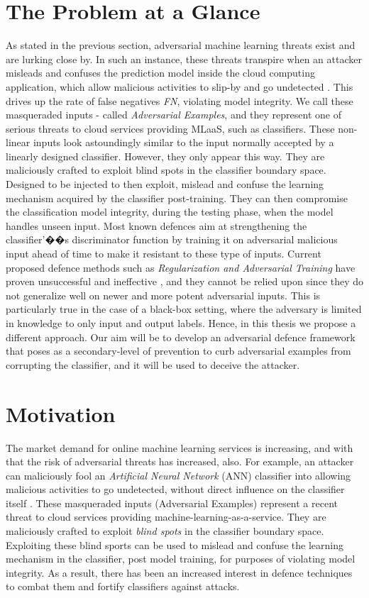 \documentclass[grad,lot,lof,11pt,oneside,onehalfspace]{RUthesis}
\begin{document}
\section{The Problem at a Glance}
  As  stated in the previous section, adversarial machine learning threats exist and are lurking close by. In such an instance, these threats transpire when an attacker misleads and confuses the prediction model inside the cloud computing application, which allow malicious activities to slip-by and go undetected \cite{nguyen_deep_2015}. This  drives up the rate of false negatives \textit{FN}, violating model integrity. We call these masqueraded inputs - called \textit{Adversarial Examples}\cite{kurakin_adversarial_2017}, and they represent one of serious threats to cloud services providing MLaaS, such as classifiers. These non-linear inputs look astoundingly similar to the input normally accepted by a linearly designed classifier. However, they only appear this way. They are maliciously crafted to exploit blind spots in the classifier boundary space. Designed to be injected to then exploit, mislead and confuse the learning mechanism acquired by the classifier post-training. They can then compromise the classification model integrity, during the testing phase, when the model handles unseen input. Most known defences aim at strengthening the classifier'��s discriminator function by training it on adversarial malicious input ahead of time to make it resistant to these type of inputs. Current proposed defence methods such as \textit{Regularization and Adversarial Training} have proven unsuccessful and ineffective \cite{yuan_adversarial_2017}, and they cannot be relied upon since they do not generalize well on newer and more potent adversarial inputs.  This is particularly true in the case of a black-box setting, where the adversary is limited in knowledge to only input and output labels. Hence, in this thesis we propose a different approach. Our aim will be to develop an adversarial defence framework that poses as a secondary-level of prevention to curb adversarial examples from corrupting the classifier, and it will be used to deceive  the attacker.
  
  
\section{Motivation}
  The market demand for online machine learning services is increasing, and with that the risk of adversarial threats has increased, also. For example, an attacker can maliciously fool an \textit{Artificial Neural Network} (ANN) classifier into allowing malicious activities to go undetected, without direct influence on the classifier itself \cite{nguyen_deep_2015}. These masqueraded inputs (Adversarial Examples) represent a recent threat to cloud services providing machine-learning-as-a-service. They are maliciously crafted to exploit \textit{blind spots} in the classifier boundary space. Exploiting these blind sports can be used to mislead and confuse the learning mechanism in the classifier, post model training, for purposes of violating model integrity. As a result, there has been an increased interest in defence techniques to combat them and fortify classifiers against attacks. 
  
\end{document}

